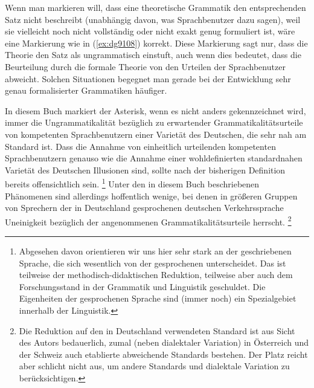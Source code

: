 \begin{exe}
  \ex\label{ex:grammi2types}
  \begin{xlist}
  \end{xlist}
\end{exe}

Wenn man markieren will, dass eine theoretische Grammatik den entsprechenden Satz nicht beschreibt (unabhängig davon, was Sprachbenutzer dazu sagen), weil sie vielleicht noch nicht vollständig oder nicht exakt genug formuliert ist, wäre eine Markierung wie in (\ref{ex:dg9108}) korrekt.
Diese Markierung sagt nur, dass die Theorie den Satz als ungrammatisch einstuft, auch wenn dies bedeutet, dass die Beurteilung durch die formale Theorie von den Urteilen der Sprachbenutzer abweicht.
Solchen Situationen begegnet man gerade bei der Entwicklung sehr genau formalisierter Grammatiken häufiger.

\begin{exe}
\end{exe}

In diesem Buch markiert der Asterisk, wenn es nicht anders gekennzeichnet wird, immer die Ungrammatikalität bezüglich zu erwartender Grammatikalitätsurteile von kompetenten Sprachbenutzern einer Varietät des Deutschen, die sehr nah am Standard ist.
Dass die Annahme von einheitlich urteilenden kompetenten Sprachbenutzern genauso wie die Annahme einer wohldefinierten standardnahen Varietät des Deutschen Illusionen sind, sollte nach der bisherigen Definition bereits offensichtlich sein.%
\footnote{Abgesehen davon orientieren wir uns hier sehr stark an der geschriebenen Sprache, die sich wesentlich von der gesprochenen unterscheidet.
Das ist teilweise der methodisch-didaktischen Reduktion, teilweise aber auch dem Forschungsstand in der Grammatik und Linguistik geschuldet.
Die Eigenheiten der gesprochenen Sprache sind (immer noch) ein Spezialgebiet innerhalb der Linguistik.}
Unter den in diesem Buch beschriebenen Phänomenen sind allerdings hoffentlich wenige, bei denen in größeren Gruppen von Sprechern der in Deutschland gesprochenen deutschen Verkehrssprache Uneinigkeit bezüglich der angenommenen Grammatikalitätsurteile herrscht.%
\footnote{Die Reduktion auf den in Deutschland verwendeten Standard ist aus Sicht des Autors bedauerlich, zumal (neben dialektaler Variation) in Österreich und der Schweiz auch etablierte abweichende Standards bestehen.
Der Platz reicht aber schlicht nicht aus, um andere Standards und dialektale Variation zu berücksichtigen.}

